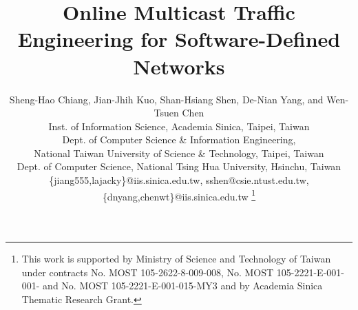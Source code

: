 \documentclass[10pt, conference, letterpaper]{IEEEtran}
\theoremstyle{definition}
\begin{document}
\title{Online Multicast Traffic Engineering for Software-Defined Networks %
}
\author{Sheng-Hao Chiang, Jian-Jhih Kuo, Shan-Hsiang Shen, De-Nian Yang, and Wen-Tsuen Chen\\
Inst. of Information Science, Academia Sinica, Taipei, Taiwan\\
Dept. of Computer Science \& Information Engineering, \\National Taiwan University of Science \& Technology, Taipei, Taiwan\\
Dept. of Computer Science, National Tsing Hua University, Hsinchu, Taiwan\\
\{jiang555,lajacky\}@iis.sinica.edu.tw, sshen@csie.ntust.edu.tw, \{dnyang,chenwt\}@iis.sinica.edu.tw
\thanks{
This work is supported by Ministry of Science and Technology of Taiwan under contracts No. MOST 105-2622-8-009-008, No. MOST 105-2221-E-001-001- and No. MOST 105-2221-E-001-015-MY3 and by Academia Sinica Thematic Research Grant.
}
}
\maketitle
\end{document}
